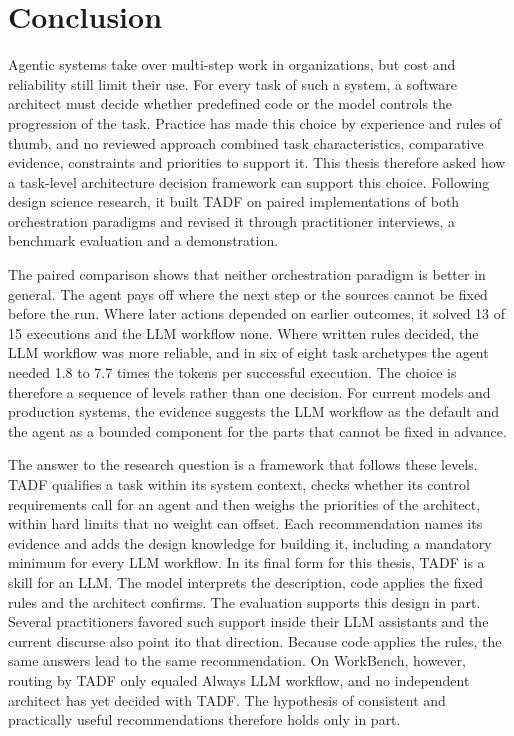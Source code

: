 \clearpage
\section{Conclusion}
\label{sec:Conclusion}
\label{sec:conclusion}

Agentic systems take over multi-step work in organizations, but cost and reliability still limit their use. For every task of such a system, a software architect must decide whether predefined code or the model controls the progression of the task. Practice has made this choice by experience and rules of thumb, and no reviewed approach combined task characteristics, comparative evidence, constraints and priorities to support it. This thesis therefore asked how a task-level architecture decision framework can support this choice. Following design science research, it built TADF on paired implementations of both orchestration paradigms and revised it through practitioner interviews, a benchmark evaluation and a demonstration.

The paired comparison shows that neither orchestration paradigm is better in general. The agent pays off where the next step or the sources cannot be fixed before the run. Where later actions depended on earlier outcomes, it solved 13 of 15 executions and the LLM workflow none. Where written rules decided, the LLM workflow was more reliable, and in six of eight task archetypes the agent needed 1.8 to 7.7 times the tokens per successful execution. The choice is therefore a sequence of levels rather than one decision. For current models and production systems, the evidence suggests the LLM workflow as the default and the agent as a bounded component for the parts that cannot be fixed in advance.

The answer to the research question is a framework that follows these levels. TADF qualifies a task within its system context, checks whether its control requirements call for an agent and then weighs the priorities of the architect, within hard limits that no weight can offset. Each recommendation names its evidence and adds the design knowledge for building it, including a mandatory minimum for every LLM workflow. In its final form for this thesis, TADF is a skill for an LLM. The model interprets the description, code applies the fixed rules and the architect confirms. The evaluation supports this design in part. Several practitioners favored such support inside their LLM assistants and the current discurse also point ito that direction. Because code applies the rules, the same answers lead to the same recommendation. On WorkBench, however, routing by TADF only equaled Always LLM workflow, and no independent architect has yet decided with TADF. The hypothesis of consistent and practically useful recommendations therefore holds only in part.

